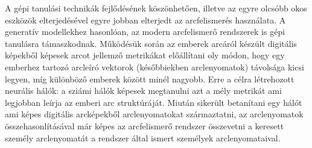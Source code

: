 





A gépi tanulási technikák fejlődésének köszönhetően, illetve az egyre olcsóbb okos eszközök elterjedésével egyre jobban elterjedt az arcfelismerés használata. A generatív modellekhez hasonlóan, az modern arcfelismerő rendszerek is gépi tanulásra támaszkodnak. Működésük során az emberek arcáról készült digitális képekből képesek arcot jellemző metrikákat előállítani oly módon, hogy egy emberhez tartozó arcleíró vektorok (későbbiekben arclenyomatok) távolsága kicsi legyen, míg különböző emberek között minél nagyobb. Erre a célra létrehozott neurális hálók: a sziámi hálók képesek megtanulni azt a mély metrikát ami legjobban leírja az emberi arc struktúráját. Miután sikerült betanítani egy hálót ami képes digitális arcképekből arclenyomatokat származtatni, az arclenyomatok összehasonlításával már képes az arcfelismerő rendszer összevetni a keresett személy arclenyomatát a rendszer által ismert személyek arclenyomataival.

